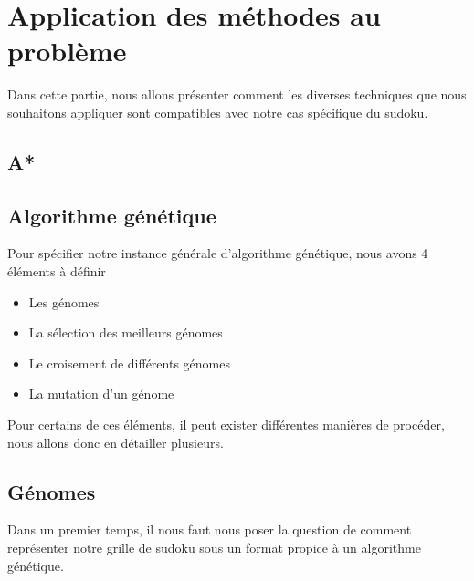 \chapter{Application des méthodes au problème}

    Dans cette partie, nous allons présenter comment les diverses techniques que nous souhaitons appliquer sont compatibles avec notre cas spécifique du sudoku.
    \section{A*}
    \section{Algorithme génétique}
        Pour spécifier notre instance générale d'algorithme génétique, nous avons 4 éléments à définir
        \begin{itemize}
            \item Les génomes
            \item La sélection des meilleurs génomes
            \item Le croisement de différents génomes
            \item La mutation d'un génome
        \end{itemize}
        Pour certains de ces éléments, il peut exister différentes manières de procéder, nous allons donc en détailler plusieurs.
        \section{Génomes}
            Dans un premier temps, il nous faut nous poser la question de comment représenter notre grille de sudoku sous un format propice à un algorithme génétique.\\
